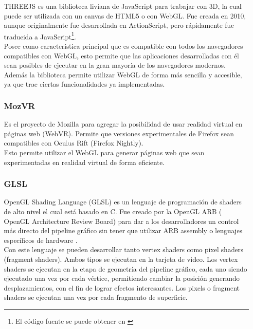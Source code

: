 \documentclass[12pt]{article}
\begin{document}
THREEJS es una biblioteca liviana\cite{three} de JavaScript para trabajar con 3D, la cual puede ser utilizada con un canvas de HTML5 o con WebGL. Fue creada en 2010, aunque originalmente fue desarrollada en ActionScript, pero rápidamente fue traducida a JavaScript\footnote{El código fuente se puede obtener en \cite{codigothree}}.
\\Posee como característica principal que es compatible con todos los navegadores compatibles con WebGL, esto permite que las aplicaciones desarrolladas con él sean posibles de ejecutar en la gran mayoría de los navegadores modernos.
\\Además la biblioteca permite utilizar WebGL de forma más sencilla y accesible, ya que trae ciertas funcionalidades ya implementadas.
\subsubsection{MozVR}
Es el proyecto de Mozilla para agregar la posibilidad de usar realidad virtual en páginas web (WebVR)\cite{mozvr}. Permite que versiones experimentales de Firefox sean compatibles con Oculus Rift (Firefox Nightly\cite{nightly}).
\\Esto permite utilizar el WebGL para generar páginas web que sean experimentadas en realidad virtual de forma eficiente.
\subsubsection{GLSL}
OpenGL Shading Language (GLSL) es un lenguaje de programación de shaders de alto nivel el cual está basado en C. Fue creado por la OpenGL ARB ( OpenGL Architecture Review Board) para dar a los desarrolladores un control más directo del pipeline gráfico sin tener que utilizar ARB assembly o lenguajes específicos de hardware .
\\Con este lenguaje se pueden desarrollar tanto vertex shaders como pixel shaders (fragment shaders). Ambos tipos se ejecutan en la tarjeta de video. Los vertex shaders se ejecutan en la etapa de geometría del pipeline gráfico, cada uno siendo ejecutado una vez por cada vértice, permitiendo cambiar la posición generando desplazamientos, con el fin de lograr efectos interesantes. Los pixels o fragment shaders se ejecutan una vez por cada fragmento de superficie.

\clearpage
\end{document}
